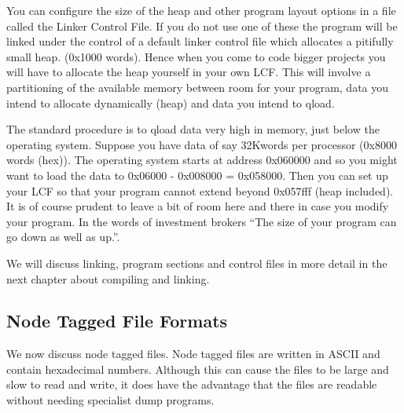 You can configure the size of the heap and other program layout
options in a file called the Linker Control File. If you do not 
use one of these the program will be linked under the control of 
a default linker control file which allocates a pitifully small heap.
(0x1000 words). Hence when you come to code bigger projects you
will have to allocate the heap yourself in your own LCF. This will
involve a partitioning of the available memory between room for 
your program, data you intend to allocate dynamically (heap) and data
you intend to qload. 

The standard procedure is to qload data very high in memory, just
below the operating system. Suppose you have data of say 32Kwords per
processor (0x8000 words (hex)). The operating system starts at address
0x060000 and so you might want to load the data to 0x06000 - 0x008000
= 0x058000. Then you can set up your LCF so that your program cannot
extend beyond 0x057fff (heap included). It is of course prudent to
leave a bit of room here and there in case you modify your program. In
the words of investment brokers ``The size of your program can go down
as well as up.''.

We will discuss linking, program sections and control files in more detail
in the next chapter about compiling and linking.

\subsection{Node Tagged File Formats}
We now discuss node tagged files.
Node tagged files are written in ASCII and contain hexadecimal numbers.
Although this can cause the files to be large and slow to read and write,
it does have the advantage that the files are readable without needing
specialist dump programs.

